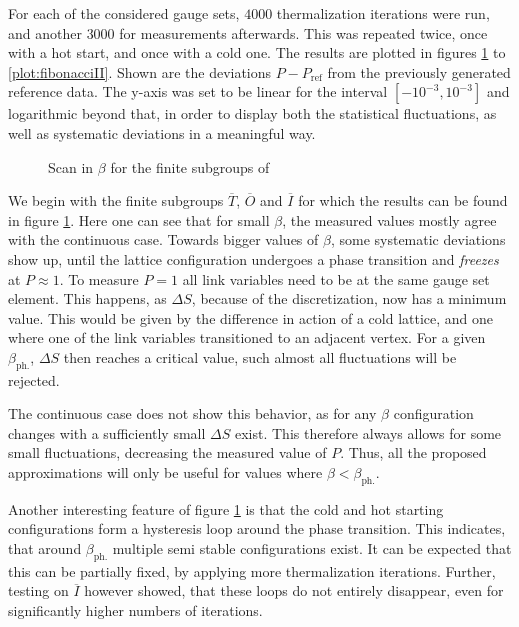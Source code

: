 For each of the considered gauge sets, $4000$ thermalization iterations were run, and another $3000$ for measurements afterwards. This was repeated twice, once with a hot start, and once with a cold one. The results are plotted in figures \ref{plot:subgroups} to \ref{plot:fibonacciII}. Shown are the deviations $P - P_{\textrm{ref}}$ from the previously generated reference data. The y-axis was set to be linear for the interval $[-10^{-3},10^{-3}]$ and logarithmic beyond that, in order to display both the statistical fluctuations, as well as systematic deviations in a meaningful way.\\
\begin{figure}[!hbt]
 \centering
 
 \caption{Scan in $\beta$ for the finite subgroups of \SUTwo}
 \label{plot:subgroups}
\end{figure}

We begin with the finite subgroups $\overline{T}$, $\overline{O}$ and $\overline{I}$ for which the results can be found in figure \ref{plot:subgroups}. Here one can see that for small $\beta$, the measured values mostly agree with the continuous case. Towards bigger values of $\beta$, some systematic deviations show up, until the lattice configuration undergoes a phase transition and \emph{freezes} at $P\approx1$. To measure $P=1$ all link variables need to be at the same gauge set element. This happens, as  $\Delta S$, because of the discretization, now has a minimum value. This would be given by the difference in action of a cold lattice, and one where one of the link variables transitioned to an adjacent vertex. For a given $\beta_{\textrm{ph.}}$, $\Delta S$ then reaches a critical value, such almost all fluctuations will be rejected.

The continuous case does not show this behavior, as for any $\beta$ configuration changes with a sufficiently small $\Delta S$ exist. This therefore always allows for some small fluctuations, decreasing the measured value of $P$. Thus, all the proposed approximations will only be useful for values where $\beta < \beta_{\textrm{ph.}}$.

Another interesting feature of figure \ref{plot:subgroups} is that the cold and hot starting configurations form a hysteresis loop around the phase transition. This indicates, that around $\beta_{\textrm{ph.}}$ multiple semi stable configurations exist. It can be expected that this can be partially fixed, by applying more thermalization iterations. Further, testing on $\overline{I}$ however showed, that these loops do not entirely disappear, even for significantly higher numbers of iterations.

